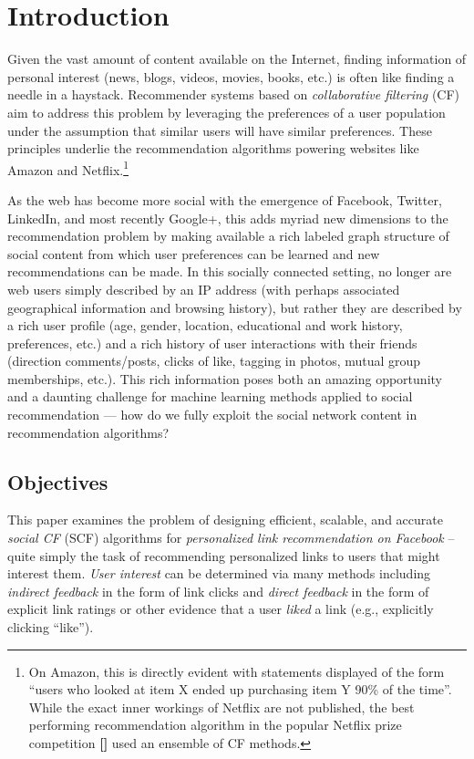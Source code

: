 
\chapter{Introduction}
\label{cha:intro}

Given the vast amount of content available on the Internet, finding
information of personal interest (news, blogs, videos, movies, books,
etc.) is often like finding a needle in a haystack.  Recommender
systems based on \emph{collaborative filtering} (CF) aim to address
this problem by leveraging the preferences of a user
population under the assumption that similar users
will have similar preferences.  These principles underlie the
recommendation algorithms powering websites like Amazon and
Netflix.\footnote{On Amazon, this is directly evident with statements
displayed of the form ``users who looked at item X ended up purchasing
item Y 90\% of the time''.  While the exact inner workings of Netflix
are not published, the best performing recommendation algorithm in
the popular Netflix prize competition {\bf []} 
used an ensemble of CF methods.}

As the web has become more social with the emergence of Facebook,
Twitter, LinkedIn, and most recently Google+, this adds myriad new
dimensions to the recommendation problem by making available a rich
labeled graph structure of social content from which user preferences
can be learned and new recommendations can be made.  In this socially
connected setting, no longer are web users simply described by an IP
address (with perhaps associated geographical information and browsing
history), but rather they are described by a rich user profile (age,
gender, location, educational and work history, preferences, etc.)
and a rich history of user interactions with their friends (direction
comments/posts, clicks of like, tagging in photos, mutual group
memberships, etc.).  This rich information poses both an amazing
opportunity and a daunting challenge for machine learning methods
applied to social recommendation --- how do we fully exploit the social
network content in recommendation algorithms?

\section{Objectives}

This paper examines the problem of designing efficient, scalable, and
accurate \emph{social CF} (SCF) algorithms for \emph{personalized link
recommendation on Facebook} -- quite simply the task of recommending
personalized links to users that might interest them.  \emph{User
interest} can be determined via many methods including \emph{indirect
feedback} in the form of link clicks and \emph{direct feedback} in the form of
explicit link ratings or other evidence that a user \emph{liked}
a link (e.g., explicitly clicking ``like'').

